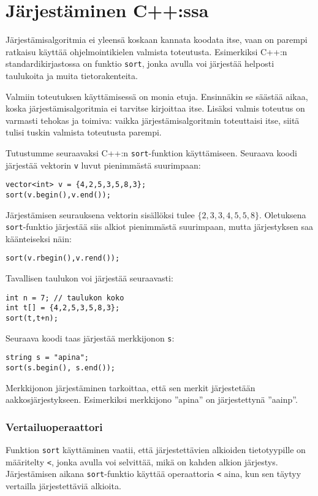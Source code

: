 \section{Järjestäminen C++:ssa}


Järjestämisalgoritmia
ei yleensä koskaan kannata koodata itse,
vaan on parempi ratkaisu käyttää
ohjelmointikielen valmista toteutusta.
Esimerkiksi
C++:n standardikirjastossa on funktio \texttt{sort},
jonka avulla voi järjestää helposti taulukoita
ja muita tietorakenteita.

Valmiin toteutuksen käyttämisessä on monia etuja.
Ensinnäkin se säästää aikaa, koska järjestämisalgoritmia
ei tarvitse kirjoittaa itse.
Lisäksi valmis toteutus on varmasti tehokas ja toimiva:
vaikka järjestämisalgoritmin toteuttaisi itse,
siitä tulisi tuskin valmista toteutusta parempi.

Tutustumme seuraavaksi C++:n \texttt{sort}-funktion
käyttämiseen.
Seuraava koodi järjestää vektorin \texttt{v}
luvut pienimmästä suurimpaan:
\begin{lstlisting}
vector<int> v = {4,2,5,3,5,8,3};
sort(v.begin(),v.end());
\end{lstlisting}
Järjestämisen seurauksena
vektorin sisällöksi tulee
$\{2,3,3,4,5,5,8\}$.
Oletuksena \texttt{sort}-funktio järjestää
siis alkiot pienimmästä suurimpaan,
mutta järjestyksen saa käänteiseksi näin:
\begin{lstlisting}
sort(v.rbegin(),v.rend());
\end{lstlisting}
Tavallisen taulukon voi järjestää seuraavasti:
\begin{lstlisting}
int n = 7; // taulukon koko
int t[] = {4,2,5,3,5,8,3};
sort(t,t+n);
\end{lstlisting}
Seuraava koodi taas järjestää merkkijonon \texttt{s}:
\begin{lstlisting}
string s = "apina";
sort(s.begin(), s.end());
\end{lstlisting}
Merkkijonon järjestäminen tarkoittaa,
että sen merkit järjestetään aakkosjärjestykseen.
Esimerkiksi merkkijono ''apina''
on järjestettynä ''aainp''.

\subsubsection{Vertailuoperaattori}


Funktion \texttt{sort} käyttäminen vaatii,
että järjestettävien alkioiden
tietotyypille on määritelty  \texttt{<},
jonka avulla voi selvittää, mikä on kahden alkion järjestys.
Järjestämisen aikana \texttt{sort}-funktio
käyttää operaattoria \texttt{<} aina, kun sen täytyy
vertailla järjestettäviä alkioita.

